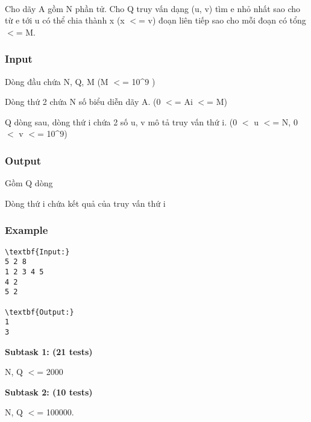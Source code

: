 

 

Cho dãy A gồm N phần tử. Cho Q truy vấn dạng (u, v) tìm e nhỏ nhất sao cho từ e tới u có thể chia thành x (x $<$= v) đoạn liên tiếp sao cho mỗi đoạn có tổng $<$= M.

\subsubsection{Input}

Dòng đầu chứa N, Q, M (M $<$= 10\textasciicircum9 )

Dòng thứ 2 chứa N số biểu diễn dãy A. (0 $<$= Ai $<$= M)

Q dòng sau, dòng thứ i chứa 2 số u, v mô tả truy vấn thứ i. (0 $<$ u $<$= N, 0 $<$ v $<$= 10\textasciicircum9)

\subsubsection{Output}

Gồm Q dòng

Dòng thứ i chứa kết quả của truy vấn thứ i

\subsubsection{Example}
\begin{verbatim}
\textbf{Input:}
5 2 8
1 2 3 4 5
4 2
5 2

\textbf{Output:}
1
3\end{verbatim}

\textbf{Subtask 1: (21 tests) }

N, Q $<$= 2000

\textbf{Subtask 2: (10 tests) }

N, Q $<$= 100000.

 